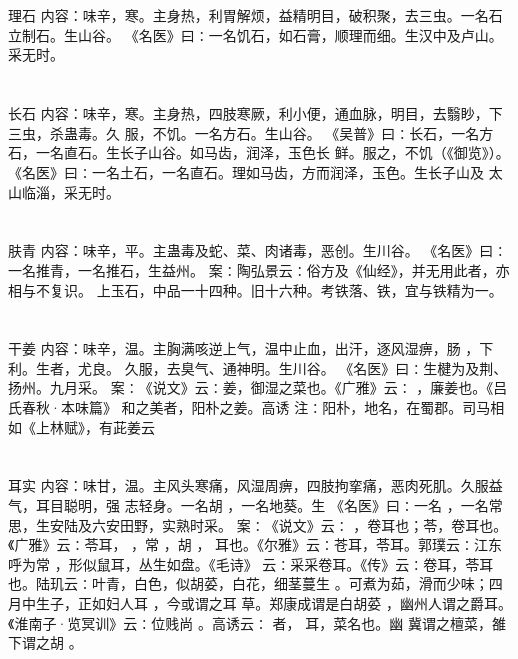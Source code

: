 \documentclass[12pt,UTF8]{ctexbook}
\begin{document}
\chapter{}理石
内容：味辛，寒。主身热，利胃解烦，益精明目，破积聚，去三虫。一名石立制石。生山谷。 
《名医》曰∶一名饥石，如石膏，顺理而细。生汉中及卢山。采无时。 


\chapter{}长石
内容：味辛，寒。主身热，四肢寒厥，利小便，通血脉，明目，去翳眇，下三虫，杀蛊毒。久 
服，不饥。一名方石。生山谷。 
《吴普》曰∶长石，一名方石，一名直石。生长子山谷。如马齿，润泽，玉色长 
鲜。服之，不饥（《御览》）。 
《名医》曰∶一名土石，一名直石。理如马齿，方而润泽，玉色。生长子山及 
太山临淄，采无时。 


\chapter{}肤青
内容：味辛，平。主蛊毒及蛇、菜、肉诸毒，恶创。生川谷。 
《名医》曰∶一名推青，一名推石，生益州。 
案∶陶弘景云∶俗方及《仙经》，并无用此者，亦相与不复识。 
上玉石，中品一十四种。旧十六种。考铁落、铁，宜与铁精为一。 


\chapter{}干姜
内容：味辛，温。主胸满咳逆上气，温中止血，出汗，逐风湿痹，肠 ，下利。生者，尤良。 
久服，去臭气、通神明。生川谷。 
《名医》曰∶生楗为及荆、扬州。九月采。 
案∶《说文》云∶姜，御湿之菜也。《广雅》云∶ ，廉姜也。《吕氏春秋·本味篇》 
和之美者，阳朴之姜。高诱 
注∶阳朴，地名，在蜀郡。司马相如《上林赋》，有茈姜云 


\chapter{}耳实
内容：味甘，温。主风头寒痛，风湿周痹，四肢拘挛痛，恶肉死肌。久服益气，耳目聪明，强 
志轻身。一名胡 ，一名地葵。生 
《名医》曰∶一名 ，一名常思，生安陆及六安田野，实熟时采。 
案∶《说文》云∶ ，卷耳也；苓，卷耳也。《广雅》云∶苓耳， ，常 ，胡 ， 
耳也。《尔雅》云∶苍耳，苓耳。郭璞云∶江东呼为常 ，形似鼠耳，丛生如盘。《毛诗》 
云∶采采卷耳。《传》云∶卷耳，苓耳也。陆玑云∶叶青，白色，似胡荽，白花，细茎蔓生 
。可煮为茹，滑而少味；四月中生子，正如妇人耳 ，今或谓之耳 草。郑康成谓是白胡荽 
，幽州人谓之爵耳。《淮南子·览冥训》云∶位贱尚 。高诱云∶ 者， 耳，菜名也。幽 
冀谓之檀菜，雒下谓之胡 。 
\end{document}
